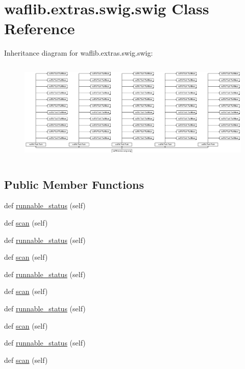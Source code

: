 \hypertarget{classwaflib_1_1extras_1_1swig_1_1swig}{}\section{waflib.\+extras.\+swig.\+swig Class Reference}
\label{classwaflib_1_1extras_1_1swig_1_1swig}
Inheritance diagram for waflib.\+extras.\+swig.\+swig\+:\begin{figure}[H]
\begin{center}
\leavevmode
\includegraphics[height=4.885906cm]{classwaflib_1_1extras_1_1swig_1_1swig}
\end{center}
\end{figure}
\subsection*{Public Member Functions}
\begin{DoxyCompactItemize}
\item 
def \hyperlink{classwaflib_1_1extras_1_1swig_1_1swig_ae54fe984d79c751df9e455555c6a79a5}{runnable\+\_\+status} (self)
\item 
def \hyperlink{classwaflib_1_1extras_1_1swig_1_1swig_a4bf24fbc333216a1e66ee4d15d2af460}{scan} (self)
\item 
def \hyperlink{classwaflib_1_1extras_1_1swig_1_1swig_ae54fe984d79c751df9e455555c6a79a5}{runnable\+\_\+status} (self)
\item 
def \hyperlink{classwaflib_1_1extras_1_1swig_1_1swig_a4bf24fbc333216a1e66ee4d15d2af460}{scan} (self)
\item 
def \hyperlink{classwaflib_1_1extras_1_1swig_1_1swig_ae54fe984d79c751df9e455555c6a79a5}{runnable\+\_\+status} (self)
\item 
def \hyperlink{classwaflib_1_1extras_1_1swig_1_1swig_a4bf24fbc333216a1e66ee4d15d2af460}{scan} (self)
\item 
def \hyperlink{classwaflib_1_1extras_1_1swig_1_1swig_ae54fe984d79c751df9e455555c6a79a5}{runnable\+\_\+status} (self)
\item 
def \hyperlink{classwaflib_1_1extras_1_1swig_1_1swig_a4bf24fbc333216a1e66ee4d15d2af460}{scan} (self)
\item 
def \hyperlink{classwaflib_1_1extras_1_1swig_1_1swig_ae54fe984d79c751df9e455555c6a79a5}{runnable\+\_\+status} (self)
\item 
def \hyperlink{classwaflib_1_1extras_1_1swig_1_1swig_a4bf24fbc333216a1e66ee4d15d2af460}{scan} (self)
\end{DoxyCompactItemize}
